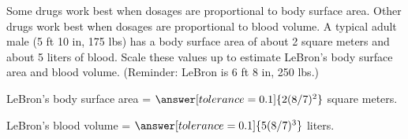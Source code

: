 \documentclass[nooutcomes]{ximera}
\begin{document}
\begin{problem}
Some drugs work best when dosages are proportional to body surface area.  Other drugs work best when dosages are proportional to blood volume.  A typical adult male (5 ft 10 in, 175 lbs)  has a body surface area of about 2 square meters and about 5 liters of blood.  Scale these values up to estimate LeBron's body surface area and blood volume.  (Reminder:  LeBron is 6 ft 8 in, 250 lbs.)

LeBron's body surface area = $\answer[tolerance=0.1]{2(8/7)^2}$ square meters. 

LeBron's blood volume = $\answer[tolerance=0.1]{5(8/7)^3}$ liters. 
\end{problem}

\end{document}
